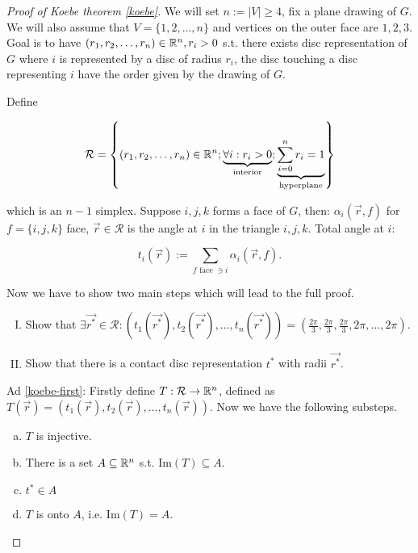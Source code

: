 \begin{proof}[Proof of Koebe theorem \ref{koebe}]
	We will set $n := |V| \geq 4$, fix a plane drawing of $G$. We will also assume that $V = \{1,2, \dots, n\}$ and vertices on the outer face are $1,2,3$. Goal is to have $(r_1, r_2, \dots, r_n) \in \mathbb{R}^n, r_i > 0$ s.t. there exists disc representation of $G$ where $i$ is represented by a disc of radius $r_i$, the disc touching a disc representing $i$ have the order given by the drawing of $G$.
	
	Define
	
	$$
	\mathcal{R} = \left\{(r_1, r_2, \dots, r_n) \in \mathbb{R}^n; \underbrace{\forall i : r_i > 0}_{\text{interior}}; \underbrace{\sum_{i = 0}^n r_i = 1}_{\text{hyperplane}}\right\}
	$$
	
	\noindent which is an $n-1$ simplex. Suppose $i,j,k$ forms a face of $G$, then: $\alpha_i(\overrightarrow{r},f)$ for $f = \{i,j,k\}$ face, $\overrightarrow{r} \in \mathcal{R}$ is the angle at $i$ in the triangle $i,j,k$. Total angle at $i$:
	
	$$
	t_i(\overrightarrow{r}) := \sum_{f \text{ face } \ni i} \alpha_i(\overrightarrow{r}, f).
	$$
	
	\noindent Now we have to show two main steps which will lead to the full proof.
	
	\begin{enumerate}[I)]
		\item Show that $\exists \overrightarrow{r^\ast} \in \mathcal{R} : (t_1(\overrightarrow{r^\ast}), t_2(\overrightarrow{r^\ast}), \dots, t_n(\overrightarrow{r^\ast})) = (\frac{2\pi}{3}, \frac{2\pi}{3}, \frac{2\pi}{3}, 2\pi, \dots, 2\pi)$. \label{koebe-first}
		\item Show that there is a contact disc representation $t^\ast$ with radii $\overrightarrow{r^\ast}$. \label{koebe-second}
	\end{enumerate}

	\noindent Ad \ref{koebe-first}: Firstly define $T : \mathcal{R} \to \mathbb{R}^n$, defined as $T(\overrightarrow{r}) = (t_1 (\overrightarrow{r}), t_2 (\overrightarrow{r}), \dots, t_n (\overrightarrow{r}))$. Now we have the following substeps.
	
	\begin{enumerate}[a)]
		\item $T$ is injective. \label{koebe-first-a}
		\item There is a set $A \subseteq \mathbb{R}^n$ s.t. $\text{Im}(T) \subseteq A$. \label{koebe-first-b}
		\item $t^\ast \in A$ \label{koebe-first-c}
		\item $T$ is onto $A$, i.e. $\text{Im}(T) = A$. \label{koebe-first-d}
	\end{enumerate}


\end{proof}
